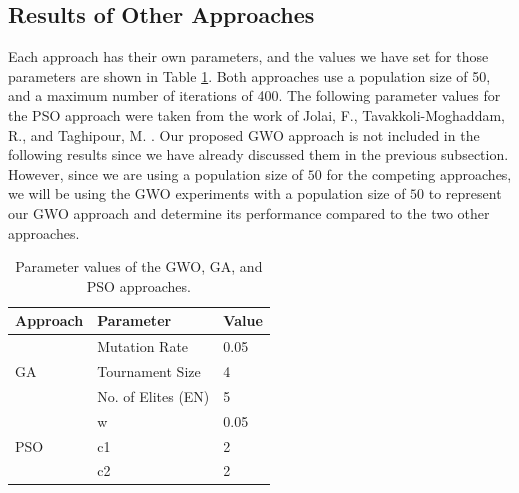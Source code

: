 \subsection{Results of Other Approaches}
Each approach has their own parameters, and the values we have set for those parameters are shown in Table \ref{approach-parameters}. Both approaches use a population size of 50, and a maximum number of iterations of 400. The following parameter values for the PSO approach were taken from the work of Jolai, F., Tavakkoli-Moghaddam, R., and Taghipour, M. \cite{Jolai2012}. Our proposed GWO approach is not included in the following results since we have already discussed them in the previous subsection. However, since we are using a population size of $50$ for the competing approaches, we will be using the GWO experiments with a population size of $50$ to represent our GWO approach and determine its performance compared to the two other approaches.

\begin{table}[h!]
	\centering
	\begin{tabular}{|l|l|l|}
		\hline
		\textbf{Approach}   & \textbf{Parameter} & \textbf{Value} \\ \hline
		\multirow{3}{*}{GA} & Mutation Rate      & 0.05           \\ \cline{2-3} 
		& Tournament Size    & 4              \\ \cline{2-3} 
		& No. of Elites (EN) & 5              \\ \hline
		\multirow{3}{*}{PSO} & w      & 0.05           \\ \cline{2-3} 
		& c1    & 2              \\ \cline{2-3} 
		& c2 	& 2              \\ \hline
	\end{tabular}
	\caption{Parameter values of the GWO, GA, and PSO approaches.}
	\label{approach-parameters}
\end{table}

